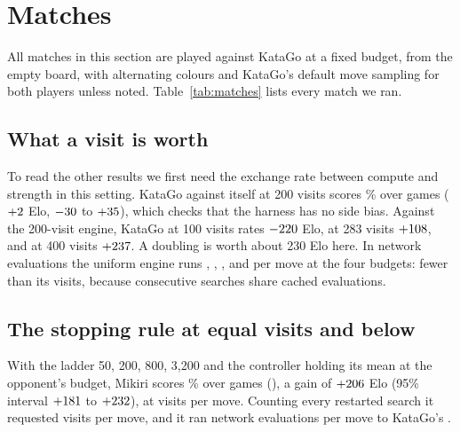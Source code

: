 \section{Matches}
\label{sec:matches}

All matches in this section are played against KataGo at a fixed budget, from the empty board, with alternating colours and KataGo's default move sampling for both players unless noted. Table~\ref{tab:matches} lists every match we ran.

\begin{table}[t]
\centering\footnotesize
\setlength{\tabcolsep}{4pt}
\resizebox{\linewidth}{!}{}
\caption{All matches. \emph{Visits} is the mean size of the deepest search per move, \emph{Restart} counts every search requested, and \emph{Evals} is network evaluations per move for the player and for its opponent, read from each engine's log.}
\label{tab:matches}
\end{table}

\subsection{What a visit is worth}

To read the other results we first need the exchange rate between compute and strength in this setting. KataGo against itself at 200 visits scores \unisameScore\% over \unisameGames{} games ($+2$ Elo, $-30$ to $+35$), which checks that the harness has no side bias. Against the 200-visit engine, KataGo at 100 visits rates $-220$ Elo, at 283 visits $+108$, and at 400 visits $+237$. A doubling is worth about 230 Elo here. In network evaluations the uniform engine runs \unihalfEvals, \unisameEvals, \unirootEvals, and \unidoubleEvals{} per move at the four budgets: fewer than its visits, because consecutive searches share cached evaluations.

\subsection{The stopping rule at equal visits and below}

With the ladder 50, 200, 800, 3{,}200 and the controller holding its mean at the opponent's budget, Mikiri scores \mainScore\% over \mainGames{} games (\mainRecord), a gain of $+206$ Elo (95\% interval $+181$ to $+232$), at \mainVisits{} visits per move. Counting every restarted search it requested \mainRestart{} visits per move, and it ran \mainEvals{} network evaluations per move to KataGo's \mainBaseEvals.

